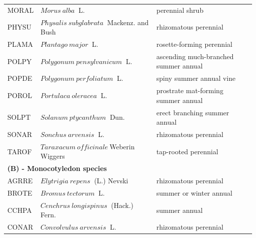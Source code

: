 \documentclass[
]{article}
\begin{document}
\begin{table}
\begin{tabular}[t]{l|l|l}
\hspace{1em}MORAL & $Morus~alba$$~$ L. & perennial shrub\\
 
\hspace{1em}PHYSU & $Physalis~subglabrata$$~$ Mackenz. and Bush & rhizomatous perennial\\
 
\hspace{1em}PLAMA & $Plantago~major$$~$ L. & rosette-forming perennial\\
 
\hspace{1em}POLPY & $Polygonum~pensylvanicum$$~$ L. & ascending much-branched summer annual\\
 
\hspace{1em}POPDE & $Polygonum~perfoliatum$$~$ L. & spiny summer annual vine\\
 
\hspace{1em}POROL & $Portulaca~oleracea$$~$ L. & prostrate mat-forming summer annual\\
 
\hspace{1em}SOLPT & $Solanum~ptycanthum$$~$ Dun. & erect branching summer annual\\
 
\hspace{1em}SONAR & $Sonchus~arvensis$$~$ L. & rhizomatous perennial\\
 
\hspace{1em}TAROF & $Taraxacum~officinale$$~$Weberin$~$Wiggers & tap-rooted perennial\\
 
\multicolumn{3}{l}{\textbf{(B) - Monocotyledon species}}\\
\hline
\hspace{1em}\hspace{1em}AGRRE & $Elytrigia~repens$$~$ (L.) Nevski & rhizomatous perennial\\
 
\hspace{1em}BROTE & $Bromus~tectorum$$~$ L. & summer or winter annual\\
 
\hspace{1em}CCHPA & $Cenchrus~longispinus$$~$ (Hack.) Fern. & summer annual\\
 
\hspace{1em}CONAR & $Convolvulus~arvensis$$~$ L. & rhizomatous perennial\\
 

\end{tabular}
\end{table}
\end{document}
